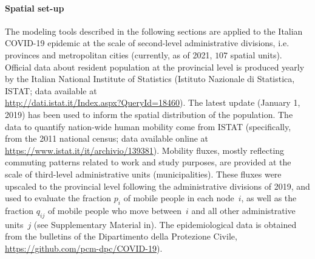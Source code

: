 

\paragraph{Spatial set-up} 
The modeling tools described in the following sections are applied to the Italian COVID-19 epidemic at the scale of second-level administrative divisions, i.e. provinces and metropolitan cities (currently, as of 2021, $107$ spatial units). Official data about resident population at the provincial level is produced yearly by the Italian National Institute of Statistics (Istituto Nazionale di Statistica, ISTAT; data available at\\ \url{http://dati.istat.it/Index.aspx?QueryId=18460}). The latest update (January 1, 2019) has been used to inform the spatial distribution of the population. %
The data to quantify nation-wide human mobility come from ISTAT (specifically, from the 2011 national census; data available online at \url{https://www.istat.it/it/archivio/139381}). Mobility fluxes, mostly reflecting commuting patterns related to work and study purposes, are provided at the scale of third-level administrative units (municipalities)\cite{Pepe:COVID19OutbreakResponse:2020,Vollmer:Report20Using:2020}. These fluxes were upscaled to the provincial level following the administrative divisions of 2019, and used to evaluate the fraction $p_i$ of mobile people in each node~$i$, as well as the fraction $q_{ij}$ of mobile people who move between~$i$ and all other administrative units~$j$ (see Supplementary Material in\cite{Gatto:SpreadDynamicsCOVID19:2020}).
The epidemiological data is obtained from the bulletins of the Dipartimento della Protezione Civile, \url{https://github.com/pcm-dpc/COVID-19}).

